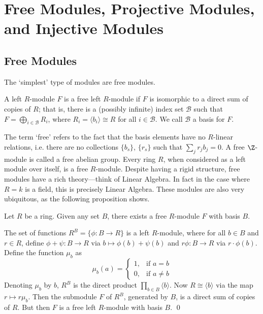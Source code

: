 \section{Free Modules, Projective Modules, and Injective Modules}
\subsection{Free Modules}

The `simplest' type of modules are free modules. 

\begin{dfn}
A left $R$-module $F$ is a free left $R$-module if $F$ is isomorphic to a direct sum of copies of $R$; that is, there is a (possibly infinite) index set $\mathcal{B}$ such that $F= \bigoplus_{i \in \mathcal{B}} R_i$, where $R_i=\langle b_i \rangle \cong R$ for all $i \in \mathcal{B}$. We call $\mathcal{B}$ a basis for $F$.
\end{dfn}

The term `free' refers to the fact that the basis elements have no $R$-linear relations, i.e. there are no collections $\{b_s\}$, $\{r_s\}$ such that $\sum_j r_jb_j=0$. A free $\Z$-module is called a free abelian group. Every ring $R$, when considered as a left module over itself, is a free $R$-module. Despite having a rigid structure, free modules have a rich theory---think of Linear Algebra. In fact in the case where $R=k$ is a field, this is precisely Linear Algebra. These modules are also very ubiquitous, as the following proposition shows.

\begin{prop} \label{prop:setbasis}
Let $R$ be a ring. Given any set $B$, there exists a free $R$-module $F$ with basis $B$.
\end{prop}

\pf The set of functions $R^B=\{ \phi: B \to R\}$ is a left $R$-module, where for all $b \in B$ and $r \in R$, define $\phi+\psi: B \to R$ via $b \mapsto \phi(b)+\psi(b)$ and $r\phi: B \to R$ via $r \cdot \phi(b)$. Define the function $\mu_b$ as
	\[
	\mu_b(a)= 
	\begin{cases}
	1, & \text{if } a=b \\
	0, & \text{if } a \neq b
	\end{cases}
	\]
Denoting $\mu_b$ by $b$, $R^B$ is the direct product $\prod_{b \in B} \langle b \rangle$. Now $R \cong \langle b \rangle$ via the map $r \mapsto r\mu_b$. Then the submodule $F$ of $R^B$, generated by $B$, is a direct sum of copies of $R$. But then $F$ is a free left $R$-module with basis $B$. \qed \\


